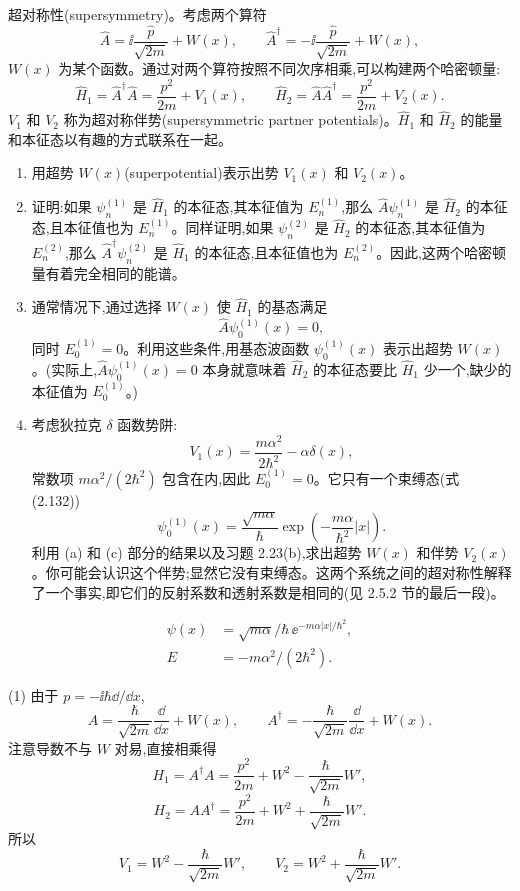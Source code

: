 \begin{question}
超对称性(supersymmetry)。考虑两个算符
\[
\hat A=\ii\frac{\hat p}{\sqrt{2m}}+W(x),
\qquad
\hat A^\dagger=-\ii\frac{\hat p}{\sqrt{2m}}+W(x),\tag{3.116}
\]
$W(x)$ 为某个函数。通过对两个算符按照不同次序相乘,可以构建两个哈密顿量:
\[
\hat H_1=\hat A^\dagger\hat A=\frac{p^2}{2m}+V_1(x),
\qquad
\hat H_2=\hat A\hat A^\dagger=\frac{p^2}{2m}+V_2(x).\tag{3.117}
\]
$V_1$ 和 $V_2$ 称为超对称伴势(supersymmetric partner potentials)。$\hat H_1$ 和 $\hat H_2$ 的能量和本征态以有趣的方式联系在一起。
\begin{enumerate}
\item 用超势 $W(x)$(superpotential)表示出势 $V_1(x)$ 和 $V_2(x)$。
\item 证明:如果 $\psi_n^{(1)}$ 是 $\hat H_1$ 的本征态,其本征值为 $E_n^{(1)}$,那么 $\hat A\psi_n^{(1)}$ 是 $\hat H_2$ 的本征态,且本征值也为 $E_n^{(1)}$。同样证明,如果 $\psi_n^{(2)}$ 是 $\hat H_2$ 的本征态,其本征值为 $E_n^{(2)}$,那么 $\hat A^\dagger\psi_n^{(2)}$ 是 $\hat H_1$ 的本征态,且本征值也为 $E_n^{(2)}$。因此,这两个哈密顿量有着完全相同的能谱。
\item 通常情况下,通过选择 $W(x)$ 使 $\hat H_1$ 的基态满足
\[
\hat A\psi_0^{(1)}(x)=0,\tag{3.118}
\]
同时 $E_0^{(1)}=0$。利用这些条件,用基态波函数 $\psi_0^{(1)}(x)$ 表示出超势 $W(x)$。(实际上,$\hat A\psi_0^{(1)}(x)=0$ 本身就意味着 $\hat H_2$ 的本征态要比 $\hat H_1$ 少一个,缺少的本征值为 $E_0^{(1)}$。)
\item 考虑狄拉克 $\delta$ 函数势阱:
\[
V_1(x)=\frac{m\alpha^2}{2\hbar^2}-\alpha\delta(x),\tag{3.119}
\]
常数项 $m\alpha^2/(2\hbar^2)$ 包含在内,因此 $E_0^{(1)}=0$。它只有一个束缚态(式 (2.132))
\[
\psi_0^{(1)}(x)=\frac{\sqrt{m\alpha}}{\hbar}\exp\left(-\frac{m\alpha}{\hbar^2}|x|\right).\tag{3.120}
\]
利用 (a) 和 (c) 部分的结果以及习题 2.23(b),求出超势 $W(x)$ 和伴势 $V_2(x)$。你可能会认识这个伴势;显然它没有束缚态。这两个系统之间的超对称性解释了一个事实,即它们的反射系数和透射系数是相同的(见 2.5.2 节的最后一段)。
\end{enumerate}

\par\smallskip
{}\[\begin{aligned}\psi(x)&=\sqrt{m\alpha}/\hbar\,\ee^{-m\alpha|x|/\hbar^2},\\E&=-m\alpha^2/(2\hbar^2).\end{aligned}\]

\begin{solution}
(1) 由于 $p=-\ii\hbar\dd/\dd x$,
\[
A=\frac{\hbar}{\sqrt{2m}}\frac{\dd}{\dd x}+W(x),
\qquad
A^\dagger=-\frac{\hbar}{\sqrt{2m}}\frac{\dd}{\dd x}+W(x).
\]
注意导数不与 $W$ 对易,直接相乘得
\[
H_1=A^\dagger A=\frac{p^2}{2m}+W^2-\frac{\hbar}{\sqrt{2m}}W',
\]
\[
H_2=AA^\dagger=\frac{p^2}{2m}+W^2+\frac{\hbar}{\sqrt{2m}}W'.
\]
所以
\[
\boxed{V_1=W^2-\frac{\hbar}{\sqrt{2m}}W',
\qquad
V_2=W^2+\frac{\hbar}{\sqrt{2m}}W'.}
\]


\end{solution}
\end{question}
